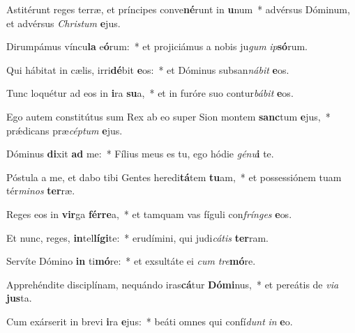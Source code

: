 \item Astitérunt reges terræ, et príncipes conve\textbf{né}runt in \textbf{u}num~* advérsus Dóminum, et advérsus \textit{Chris}\textit{tum} \textbf{e}jus.
\item Dirumpámus víncu\textbf{la} e\textbf{ó}rum:~* et projiciámus a nobis ju\textit{gum} \textit{ip}\textbf{só}rum.
\item Qui hábitat in cælis, irri\textbf{dé}bit \textbf{e}os:~* et Dóminus subsan\textit{ná}\textit{bit} \textbf{e}os.
\item Tunc loquétur ad eos in \textbf{i}ra \textbf{su}a,~* et in furóre suo contur\textit{bá}\textit{bit} \textbf{e}os.
\item Ego autem constitútus sum Rex ab eo super Sion montem \textbf{sanc}tum \textbf{e}jus,~* prǽdicans præ\textit{cép}\textit{tum} \textbf{e}jus.
\item Dóminus \textbf{di}xit \textbf{ad} me:~* Fílius meus es tu, ego hódie \textit{gé}\textit{nu}\textbf{i} te.
\item Póstula a me, et dabo tibi Gentes heredi\textbf{tá}tem \textbf{tu}am,~* et possessiónem tuam tér\textit{mi}\textit{nos} \textbf{ter}ræ.
\item Reges eos in \textbf{vir}ga \textbf{fér}\textbf{re}a,~* et tamquam vas fíguli con\textit{frín}\textit{ges} \textbf{e}os.
\item Et nunc, reges, \textbf{in}tel\textbf{lí}\textbf{gi}te:~* erudímini, qui judi\textit{cá}\textit{tis} \textbf{ter}ram.
\item Servíte Dómino \textbf{in} ti\textbf{mó}re:~* et exsultáte ei \textit{cum} \textit{tre}\textbf{mó}re.
\item Apprehéndite disciplínam, nequándo iras\textbf{cá}tur \textbf{Dó}\textbf{mi}nus,~* et pereátis de \textit{vi}\textit{a} \textbf{jus}ta.
\item Cum exárserit in brevi \textbf{i}ra \textbf{e}jus:~* beáti omnes qui confí\textit{dunt} \textit{in} \textbf{e}o.
